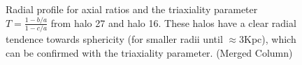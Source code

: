 \documentclass[a4paper,fleqn,usenatbib]{mnras}
\begin{document}
\begin{figure}
\centering
{}
  \hfill
\caption{Radial profile for axial ratios and the triaxiality parameter $T=\frac{1-b/a}{1-c/a}$ from halo 27 and halo 16. These halos have a clear radial tendence towards sphericity (for smaller radii until $\approx 3$Kpc), which can be confirmed with the triaxiality parameter. (Merged Column)}
\label{fig:DM_MHD}
\end{figure} 
\end{document}
